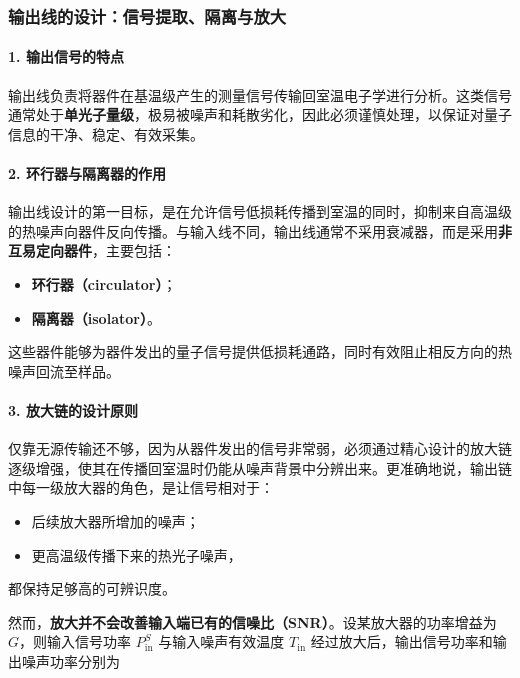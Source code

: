 \documentclass[12pt,a4paper,oneside]{ctexbook}
\begin{document}
\subsubsection{输出线的设计：信号提取、隔离与放大}

\paragraph{1. 输出信号的特点}

输出线负责将器件在基温级产生的测量信号传输回室温电子学进行分析。这类信号通常处于\textbf{单光子量级}，极易被噪声和耗散劣化，因此必须谨慎处理，以保证对量子信息的干净、稳定、有效采集。

\paragraph{2. 环行器与隔离器的作用}

输出线设计的第一目标，是在允许信号低损耗传播到室温的同时，抑制来自高温级的热噪声向器件反向传播。与输入线不同，输出线通常不采用衰减器，而是采用\textbf{非互易定向器件}，主要包括：

\begin{itemize}
    \item \textbf{环行器（circulator）}；
    \item \textbf{隔离器（isolator）}。
\end{itemize}

这些器件能够为器件发出的量子信号提供低损耗通路，同时有效阻止相反方向的热噪声回流至样品。

\paragraph{3. 放大链的设计原则}

仅靠无源传输还不够，因为从器件发出的信号非常弱，必须通过精心设计的放大链逐级增强，使其在传播回室温时仍能从噪声背景中分辨出来。更准确地说，输出链中每一级放大器的角色，是让信号相对于：

\begin{itemize}
    \item 后续放大器所增加的噪声；
    \item 更高温级传播下来的热光子噪声，
\end{itemize}

都保持足够高的可辨识度。

然而，\textbf{放大并不会改善输入端已有的信噪比（SNR）}。设某放大器的功率增益为 $G$，则输入信号功率 $P_{\mathrm{in}}^S$ 与输入噪声有效温度 $T_{\mathrm{in}}$ 经过放大后，输出信号功率和输出噪声功率分别为
\end{document}
